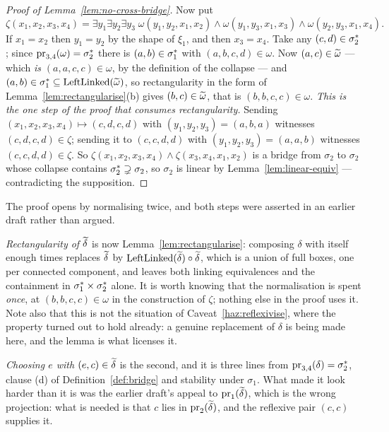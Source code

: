\begin{proof}[Proof of Lemma~\ref{lem:no-cross-bridge}]
Now put
\[
  \zeta(x_{1},x_{2},x_{3},x_{4})=\exists y_{1}\exists y_{2}\exists y_{3}\;
    \omega(y_{1},y_{2},x_{1},x_{2})\wedge\omega(y_{1},y_{3},x_{1},x_{3})
    \wedge\omega(y_{2},y_{3},x_{1},x_{4}).
\]
If $x_{1}=x_{2}$ then $y_{1}=y_{2}$ by the shape of $\xi_{1}$, and then
$x_{3}=x_{4}$. Take any $(c,d)\in\sigma_{2}^{*}$; since
$\operatorname*{pr}_{3,4}(\omega)=\sigma_{2}^{*}$ there is
$(a,b)\in\sigma_{1}^{*}$ with $(a,b,c,d)\in\omega$. Now
$(a,c)\in\widetilde{\omega}$ --- which \emph{is} $(a,a,c,c)\in\omega$, by the
definition of the collapse --- and
$(a,b)\in\sigma_{1}^{*}\subseteq\operatorname{LeftLinked}(\widetilde{\omega})$, so
rectangularity in the form of Lemma~\ref{lem:rectangularise}(b) gives
$(b,c)\in\widetilde{\omega}$, that is $(b,b,c,c)\in\omega$. \emph{This is the one
step of the proof that consumes rectangularity.} Sending
$(x_{1},x_{2},x_{3},x_{4})\mapsto(c,d,c,d)$ with $(y_{1},y_{2},y_{3})=(a,b,a)$
witnesses $(c,d,c,d)\in\zeta$; sending it to $(c,c,d,d)$ with
$(y_{1},y_{2},y_{3})=(a,a,b)$ witnesses $(c,c,d,d)\in\zeta$. So
$\zeta(x_{1},x_{2},x_{3},x_{4})\wedge\zeta(x_{3},x_{4},x_{1},x_{2})$ is a
bridge from $\sigma_{2}$ to $\sigma_{2}$ whose collapse contains
$\sigma_{2}^{*}\supsetneq\sigma_{2}$, so $\sigma_{2}$ is linear by
Lemma~\ref{lem:linear-equiv} --- contradicting the supposition.
\end{proof}

\begin{hazard}\label{haz:rectangularise}
The proof opens by normalising twice, and both steps were asserted in an
earlier draft rather than argued.

\emph{Rectangularity of $\widetilde{\delta}$} is now
Lemma~\ref{lem:rectangularise}: composing $\delta$ with itself enough times
replaces $\widetilde{\delta}$ by $\operatorname{LeftLinked}(\widetilde{\delta})\circ\widetilde{\delta}$, which is
a union of full boxes, one per connected component, and leaves both linking
equivalences and the containment in
$\sigma_{1}^{*}\times\sigma_{2}^{*}$ alone. It is worth knowing that
the normalisation is spent \emph{once}, at $(b,b,c,c)\in\omega$ in the
construction of $\zeta$; nothing else in the proof uses it. Note also that this
is not the situation of Caveat~\ref{haz:reflexivise}, where the property turned
out to hold already: a genuine replacement of $\delta$ is being made here, and
the lemma is what licenses it.

\emph{Choosing $e$ with $(e,c)\in\widetilde{\delta}$} is the second, and it is
three lines from $\operatorname*{pr}_{3,4}(\delta)=\sigma_{2}^{*}$, clause (d) of
Definition~\ref{def:bridge} and stability under $\sigma_{1}$. What made it look
harder than it is was the earlier draft's appeal to $\operatorname*{pr}_{1}(\widetilde{\delta})$,
which is the wrong projection: what is needed is that $c$ lies in
$\operatorname*{pr}_{2}(\widetilde{\delta})$, and the reflexive pair $(c,c)$ supplies it.
\end{hazard}


